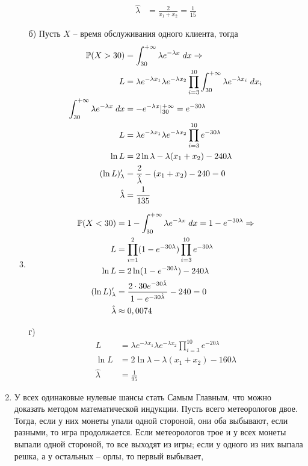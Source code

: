 \begin{enumerate}
\begin{enumerate}
\begin{align*}
\hat{\lambda}&=\frac{2}{x_1+x_2}=\frac{1}{15}
\end{align*}
\item[б)] Пусть $X$ – время обслуживания одного клиента, тогда
\begin{align*}
\P(X>30)&=\int^{+\infty}_{30}\lambda e^{-\lambda x} \; dx \Rightarrow\\
L&=\lambda e^{-\lambda x_1}\lambda e^{-\lambda x_2}\prod^{10}_{i=3}\int^{+\infty}_{30}\lambda e^{-\lambda x_i} \; dx_i\\
\int^{+\infty}_{30}\lambda e^{-\lambda x} \; dx&=-e^{-\lambda x}|^{+\infty}_{30}=e^{-30\lambda}\\
L&=\lambda e^{-\lambda x_1}\lambda e^{-\lambda x_2}\prod^{10}_{i=3}e^{-30\lambda}\\
\ln L&=2\ln \lambda-\lambda(x_1+x_2)-240\lambda\\
(\ln L)'_\lambda&=\frac{2}{\hat{\lambda}}-(x_1+x_2)-240=0\\
\hat{\lambda}&=\frac{1}{135}
\end{align*}
\item
\begin{align*}
\P(X<30)&=1-\int^{+\infty}_{30}\lambda e^{-\lambda x} \; dx=1-e^{-30\lambda} \Rightarrow\\
L&=\prod^{2}_{i=1}(1-e^{-30\lambda})\prod^{10}_{i=3}e^{-30\lambda}\\
\ln L&=2\ln (1-e^{-30\lambda})-240\lambda\\
(\ln L)'_\lambda&=\frac{2\cdot30e^{-30\hat{\lambda}}}{1-e^{-30\hat{\lambda}}}-240=0\\
\hat{\lambda}&\approx0,0074
\end{align*}
\item[г)]
\begin{align*}
L&=\lambda e^{-\lambda x_1}\lambda e^{-\lambda x_2}\prod^{10}_{i=3}e^{-20\lambda}\\
\ln L&=2\ln \lambda-\lambda(x_1+x_2)-160\lambda\\
\hat{\lambda}&=\frac{1}{95}
\end{align*}
\end{enumerate}
\item У всех одинаковые нулевые шансы стать Самым Главным, 
что можно доказать методом математической индукции. 
Пусть всего метеорологов двое. Тогда, если у них монеты
упали одной стороной, они оба выбывают, если разными, то игра продолжается. 
Если метеорологов трое и у всех монеты выпали одной стороной, то все выходят из игры;
если у одного из них выпала решка, а у остальных – орлы, то первый выбывает, 

\end{enumerate}
